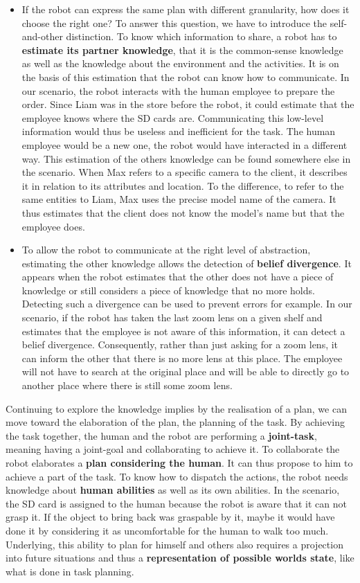 \begin{itemize}
  \item If the robot can express the same plan with different granularity, how does it choose the right one? To answer this question, we have to introduce the self-and-other distinction. To know which information to share, a robot has to \textbf{estimate its partner knowledge}, that it is the common-sense knowledge as well as the knowledge about the environment and the activities. It is on the basis of this estimation that the robot can know how to communicate. In our scenario, the robot interacts with the human employee to prepare the order. Since Liam was in the store before the robot, it could estimate that the employee knows where the SD cards are. Communicating this low-level information would thus be useless and inefficient for the task. The human employee would be a new one, the robot would have interacted in a different way. This estimation of the others knowledge can be found somewhere else in the scenario. When Max refers to a specific camera to the client, it describes it in relation to its attributes and location. To the difference, to refer to the same entities to Liam, Max uses the precise model name of the camera. It thus estimates that the client does not know the model's name but that the employee does.
  
  \item To allow the robot to communicate at the right level of abstraction, estimating the other knowledge allows the detection of \textbf{belief divergence}. It appears when the robot estimates that the other does not have a piece of knowledge or still considers a piece of knowledge that no more holds. Detecting such a divergence can be used to prevent errors for example. In our scenario, if the robot has taken the last zoom lens on a given shelf and estimates that the employee is not aware of this information, it can detect a belief divergence. Consequently, rather than just asking for a zoom lens, it can inform the other that there is no more lens at this place. The employee will not have to search at the original place and will be able to directly go to another place where there is still some zoom lens.
\end{itemize}

Continuing to explore the knowledge implies by the realisation of a plan, we can move toward the elaboration of the plan, the planning of the task. By achieving the task together, the human and the robot are performing a \textbf{joint-task}, meaning having a joint-goal and collaborating to achieve it. To collaborate the robot elaborates a \textbf{plan considering the human}. It can thus propose to him to achieve a part of the task. To know how to dispatch the actions, the robot needs knowledge about \textbf{human abilities} as well as its own abilities. In the scenario, the SD card is assigned to the human because the robot is aware that it can not grasp it. If the object to bring back was graspable by it, maybe it would have done it by considering it as uncomfortable for the human to walk too much. Underlying, this ability to plan for himself and others also requires a projection into future situations and thus a \textbf{representation of possible worlds state}, like what is done in task planning.

